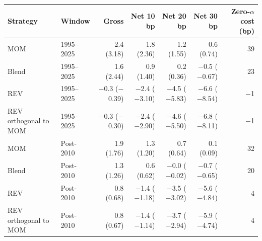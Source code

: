\begin{tabular}{llrrrrr}
\toprule
Strategy & Window & Gross & Net 10 bp & Net 20 bp & Net 30 bp & Zero-$\alpha$ cost (bp) \\
\midrule
MOM & 1995--2025 & 2.4 (3.18) & 1.8 (2.36) & 1.2 (1.55) & 0.6 (0.74) & 39 \\
Blend & 1995--2025 & 1.6 (2.44) & 0.9 (1.40) & 0.2 (0.36) & $-$0.5 ($-$0.67) & 23 \\
REV & 1995--2025 & $-$0.3 ($-$0.39) & $-$2.4 ($-$3.10) & $-$4.5 ($-$5.83) & $-$6.6 ($-$8.54) & $-$1 \\
REV orthogonal to MOM & 1995--2025 & $-$0.3 ($-$0.30) & $-$2.4 ($-$2.90) & $-$4.6 ($-$5.50) & $-$6.8 ($-$8.11) & $-$1 \\
MOM & Post-2010 & 1.9 (1.76) & 1.3 (1.20) & 0.7 (0.64) & 0.1 (0.09) & 32 \\
Blend & Post-2010 & 1.3 (1.26) & 0.6 (0.62) & $-$0.0 ($-$0.02) & $-$0.7 ($-$0.65) & 20 \\
REV & Post-2010 & 0.8 (0.68) & $-$1.4 ($-$1.18) & $-$3.5 ($-$3.02) & $-$5.6 ($-$4.84) & 4 \\
REV orthogonal to MOM & Post-2010 & 0.8 (0.67) & $-$1.4 ($-$1.14) & $-$3.7 ($-$2.94) & $-$5.9 ($-$4.74) & 4 \\
\bottomrule
\end{tabular}
